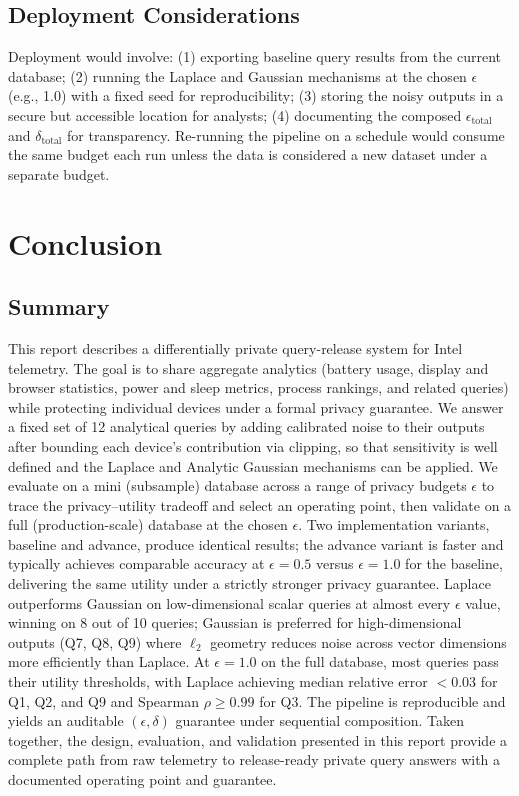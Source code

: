 \documentclass[12pt,letterpaper]{article}
\begin{document}
\subsection{Deployment Considerations}
\label{sec:disc_deployment}

Deployment would involve: (1) exporting baseline query results from the current database; (2) running the Laplace and Gaussian mechanisms at the chosen $\epsilon$ (e.g., 1.0) with a fixed seed for reproducibility; (3) storing the noisy outputs in a secure but accessible location for analysts; (4) documenting the composed $\epsilon_{\text{total}}$ and $\delta_{\text{total}}$ for transparency. Re-running the pipeline on a schedule would consume the same budget each run unless the data is considered a new dataset under a separate budget.

\section{Conclusion}
\label{sec:conclusion}

\subsection{Summary}
This report describes a differentially private query-release system for Intel telemetry. The goal is to share aggregate analytics (battery usage, display and browser statistics, power and sleep metrics, process rankings, and related queries) while protecting individual devices under a formal privacy guarantee. We answer a fixed set of 12 analytical queries by adding calibrated noise to their outputs after bounding each device's contribution via clipping, so that sensitivity is well defined and the Laplace and Analytic Gaussian mechanisms can be applied. We evaluate on a mini (subsample) database across a range of privacy budgets $\epsilon$ to trace the privacy--utility tradeoff and select an operating point, then validate on a full (production-scale) database at the chosen $\epsilon$. Two implementation variants, baseline and advance, produce identical results; the advance variant is faster and typically achieves comparable accuracy at $\epsilon = 0.5$ versus $\epsilon = 1.0$ for the baseline, delivering the same utility under a strictly stronger privacy guarantee. Laplace outperforms Gaussian on low-dimensional scalar queries at almost every $\epsilon$ value, winning on 8 out of 10 queries; Gaussian is preferred for high-dimensional outputs (Q7, Q8, Q9) where $\ell_2$ geometry reduces noise across vector dimensions more efficiently than Laplace. At $\epsilon = 1.0$ on the full database, most queries pass their utility thresholds, with Laplace achieving median relative error $<0.03$ for Q1, Q2, and Q9 and Spearman $\rho \geq 0.99$ for Q3. The pipeline is reproducible and yields an auditable $(\epsilon,\delta)$ guarantee under sequential composition. Taken together, the design, evaluation, and validation presented in this report provide a complete path from raw telemetry to release-ready private query answers with a documented operating point and guarantee.
\end{document}

